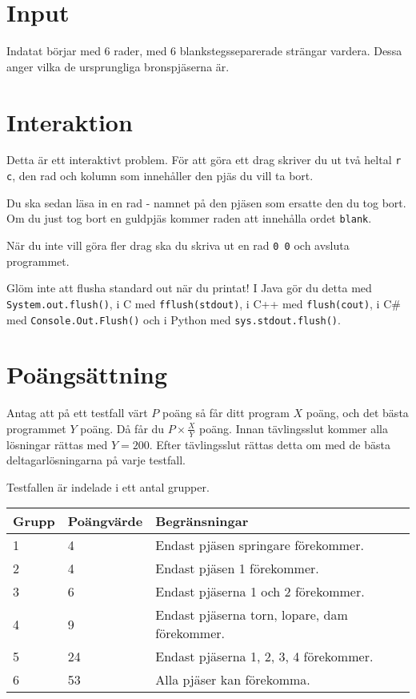 \section*{Input}
Indatat börjar med 6 rader, med 6 blankstegsseparerade strängar vardera. Dessa anger vilka de ursprungliga
bronspjäserna är.

\section*{Interaktion}
Detta är ett interaktivt problem. För att göra ett drag skriver du ut två heltal \texttt{r c}, den rad och kolumn som
innehåller den pjäs du vill ta bort.

Du ska sedan läsa in en rad - namnet på den pjäsen som ersatte den du tog bort. Om du just tog bort en guldpjäs kommer raden att innehålla ordet \texttt{blank}.

När du inte vill göra fler drag ska du skriva ut en rad \texttt{0 0} och avsluta programmet.

Glöm inte att flusha standard out när du printat! I Java gör du detta med \texttt{System.out.flush()},
i C med \texttt{fflush(stdout)}, i C++ med \texttt{flush(cout)}, i C\# med \texttt{Console.Out.Flush()}
och i Python med \texttt{sys.stdout.flush()}.

\section*{Poängsättning}
Antag att på ett testfall värt $P$ poäng så får ditt program $X$ poäng, och det bästa programmet $Y$ poäng.
Då får du $P \times \frac{X}{Y}$ poäng. Innan tävlingsslut kommer alla lösningar rättas med $Y = 200$.
Efter tävlingsslut rättas detta om med de bästa deltagarlösningarna på varje testfall.

Testfallen är indelade i ett antal grupper.

\begin{tabular}{| l | l | l |}
  \hline
  Grupp & Poängvärde & Begränsningar\\ \hline
  1     & 4          & Endast pjäsen springare förekommer. \\ \hline
  2     & 4          & Endast pjäsen 1 förekommer. \\ \hline
  3     & 6          & Endast pjäserna 1 och 2 förekommer. \\ \hline
  4     & 9          & Endast pjäserna torn, lopare, dam förekommer. \\ \hline
  5     & 24         & Endast pjäserna 1, 2, 3, 4 förekommer. \\ \hline
  6     & 53         & Alla pjäser kan förekomma. \\ \hline
\end{tabular}
